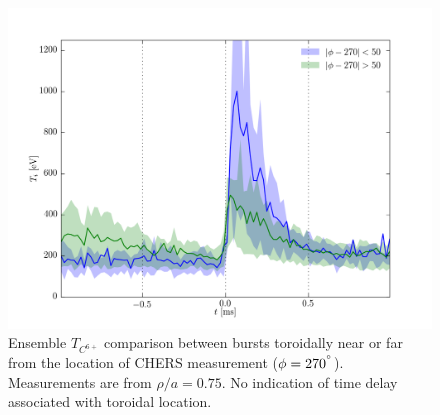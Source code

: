 \begin{refsection}
\begin{figure}
	\centering
	\includegraphics[width = 1.\linewidth]{./m0_and_impurity_heating/m0_no_delay.png}
	\caption{Ensemble $T_{C^{6+}}$ comparison between bursts toroidally near or far from the location of CHERS measurement ($\phi = 270^{\degree}$). Measurements are from $\rho/a = 0.75$. No indication of time delay associated with toroidal location.}\label{fig:m0_no_delay}
\end{figure}



\end{refsection}
